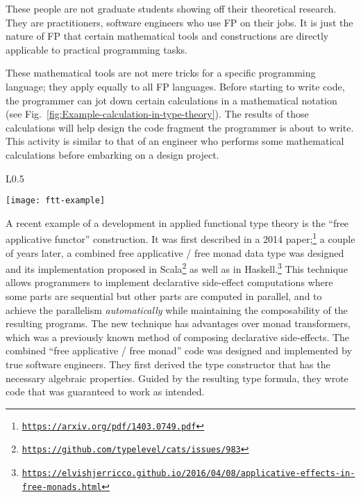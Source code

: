 These people are not graduate students showing off their theoretical
research. They are practitioners, software engineers who use FP on
their jobs. It is just the nature of FP that certain mathematical
tools and constructions are directly applicable to practical programming
tasks.

These mathematical tools are not mere tricks for a specific programming
language; they apply equally to all FP languages. Before starting
to write code, the programmer can jot down certain calculations in
a mathematical notation (see Fig.\ \ref{fig:Example-calculation-in-type-theory}).
The results of those calculations will help design the code fragment
the programmer is about to write. This activity is similar to that
of an engineer who performs some mathematical calculations before
embarking on a design project. \begin{wrapfigure}{L}{0.5\textwidth}%
\begin{centering}
{\footnotesize{}\vspace{0.25\baselineskip}
\texttt{[image: ftt-example]}\vspace{-0.25\baselineskip}
}{\footnotesize\par}
\par\end{centering}
{\footnotesize{}\caption{A programmer performs a derivation before writing Haskell code.\label{fig:Example-calculation-in-type-theory}}
}{\footnotesize\par}

\vspace{-0.5\baselineskip}
\end{wrapfigure}%
 

\noindent A recent example of a development in applied functional
type theory is the \textsf{``}free applicative functor\textsf{''} construction. It
was first described in a 2014 paper;\footnote{\texttt{\href{https://arxiv.org/pdf/1403.0749.pdf}{https://arxiv.org/pdf/1403.0749.pdf}}}
a couple of years later, a combined free applicative / free monad
data type was designed and its implementation proposed in Scala\footnote{\texttt{\href{https://github.com/typelevel/cats/issues/983}{https://github.com/typelevel/cats/issues/983}}}
as well as in Haskell.\footnote{\texttt{\href{https://elvishjerricco.github.io/2016/04/08/applicative-effects-in-free-monads.html}{https://elvishjerricco.github.io/2016/04/08/applicative-effects-in-free-monads.html}}}
This technique allows programmers to implement declarative side-effect
computations where some parts are sequential but other parts are computed
in parallel, and to achieve the parallelism \emph{automatically} while
maintaining the composability of the resulting programs. The new technique
has advantages over monad transformers, which was a previously known
method of composing declarative side-effects. The combined \textsf{``}free
applicative / free monad\textsf{''} code was designed and implemented by true
software engineers. They first derived the type constructor that has
the necessary algebraic properties. Guided by the resulting type formula,
they wrote code that was guaranteed to work as intended.

